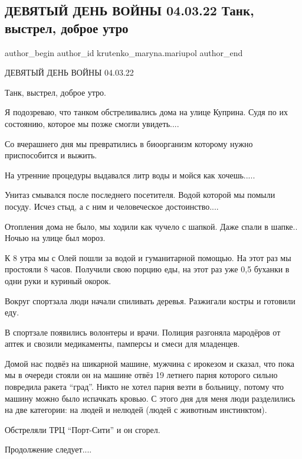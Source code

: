  
 
 
 
 

\subsection{ДЕВЯТЫЙ ДЕНЬ ВОЙНЫ 04.03.22 Танк, выстрел, доброе утро}
\label{sec:04_03_2023.fb.krutenko_maryna.mariupol.1.devjatyj_den_04_03_tank_vystrel_dobroje_utro}

\ifcmt
 author_begin
   author_id krutenko_maryna.mariupol
 author_end
\fi

ДЕВЯТЫЙ ДЕНЬ ВОЙНЫ 04.03.22

Танк, выстрел, доброе утро.

Я подозреваю, что танком обстреливались дома на улице Куприна. Судя по их
состоянию, которое мы позже смогли увидеть....

Со вчерашнего дня мы превратились в биоорганизм которому нужно приспособится и
выжить. 

На утренние процедуры выдавался литр воды и мойся как хочешь.....

Унитаз смывался после последнего посетителя. Водой которой мы помыли посуду.
Исчез стыд, а с ним и человеческое достоинство....

Отопления дома не было, мы ходили как чучело с шапкой. Даже спали в шапке..
Ночью на улице был мороз. 

К 8 утра мы с Олей пошли за водой и гуманитарной помощью. На этот раз мы
простояли 8 часов. Получили свою порцию еды, на этот раз уже 0,5 буханки в одни
руки и куриный окорок. 

Вокруг спортзала люди начали спиливать деревья. Разжигали костры и готовили
еду. 

В спортзале появились волонтеры и врачи. Полиция разгоняла мародёров от аптек и
свозили медикаменты, памперсы и смеси для младенцев. 

Домой нас подвёз на шикарной машине,  мужчина с ирокезом и сказал, что пока мы
в очереди стояли он на машине отвёз 19 летнего парня которого сильно повредила
ракета \enquote{град}. Никто не хотел парня везти в больницу, потому что машину можно
было испачкать кровью.  С этого дня для меня люди разделились на две категории:
на людей и нелюдей (людей с животным инстинктом). 

Обстреляли ТРЦ \enquote{Порт-Сити} и он сгорел. 

Продолжение следует....

